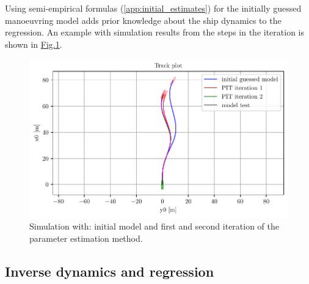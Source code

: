 \noindent Using semi-empirical formulas (\autoref{app:initial_estimates}) for the initially guessed manoeuvring model adds prior knowledge about the ship dynamics to the regression. An example with simulation results from the steps in the iteration is shown in \hyperref[\detokenize{01.01_method:iterations}]{Fig.\@\ref{\detokenize{01.01_method:iterations}}}.


\begin{figure}[H]
    \centering
    \includegraphics[width=\textwidth]{kappa/images/0.pdf}
    \caption{Simulation with: initial model and first and second iteration of the parameter estimation method.}
    \label{\detokenize{01.01_method:iterations}}
\end{figure}

\subsection{Inverse dynamics and regression}
\label{\detokenize{03.01_inverse_dynamics:inverse-dynamics-and-regression}}\label{\detokenize{03.01_inverse_dynamics::doc}}

